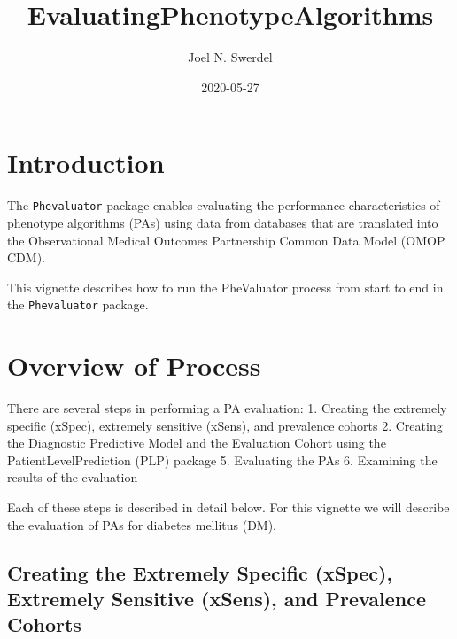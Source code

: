 \documentclass[
]{article}
\title{EvaluatingPhenotypeAlgorithms}
\author{Joel N. Swerdel}
\date{2020-05-27}
\begin{document}
\maketitle

{
\setcounter{tocdepth}{3}
\tableofcontents
}
\newpage

\hypertarget{introduction}{%
\section{Introduction}\label{introduction}}

The \texttt{Phevaluator} package enables evaluating the performance
characteristics of phenotype algorithms (PAs) using data from databases
that are translated into the Observational Medical Outcomes Partnership
Common Data Model (OMOP CDM).

This vignette describes how to run the PheValuator process from start to
end in the \texttt{Phevaluator} package.

\hypertarget{overview-of-process}{%
\section{Overview of Process}\label{overview-of-process}}

There are several steps in performing a PA evaluation: 1. Creating the
extremely specific (xSpec), extremely sensitive (xSens), and prevalence
cohorts 2. Creating the Diagnostic Predictive Model and the Evaluation
Cohort using the PatientLevelPrediction (PLP) package 5. Evaluating the
PAs 6. Examining the results of the evaluation

Each of these steps is described in detail below. For this vignette we
will describe the evaluation of PAs for diabetes mellitus (DM).

\hypertarget{creating-the-extremely-specific-xspec-extremely-sensitive-xsens-and-prevalence-cohorts}{%
\subsection{Creating the Extremely Specific (xSpec), Extremely Sensitive
(xSens), and Prevalence
Cohorts}\label{creating-the-extremely-specific-xspec-extremely-sensitive-xsens-and-prevalence-cohorts}}
\end{document}
